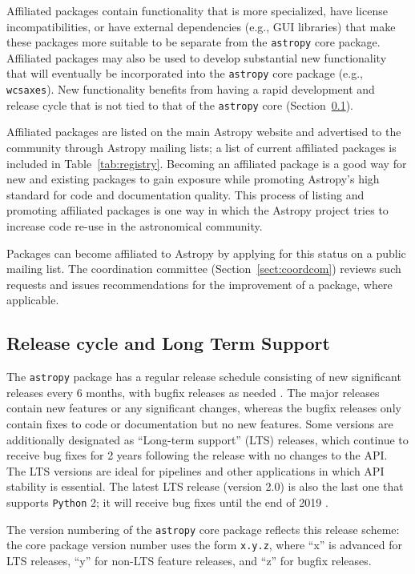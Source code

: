 \documentclass[modern]{aastex62}
\newcommand{\package}[1]{\texttt{#1}\xspace}
\newcommand{\python}{\package{Python}}
\newcommand{\astropy}{Astropy\xspace}
\newcommand{\astropypkg}{\package{astropy}}
\newcommand{\sectionname}{Section\xspace}
\renewcommand{\tablename}{Table\xspace}
\begin{document}
Affiliated packages contain functionality that is more specialized,
have license incompatibilities, or have external dependencies (e.g., GUI
libraries) that make these packages more suitable to be separate from the
\astropypkg core package.
Affiliated packages may also be used to develop substantial new functionality
that will eventually be incorporated into the \astropypkg core package
(e.g., \texttt{wcsaxes}).
New functionality benefits from having a rapid development and release cycle that is not tied to that of the \astropypkg core (\sectionname~\ref{sect:releasecycle}).

Affiliated packages are listed on the main \astropy website and advertised to
the community through \astropy mailing lists; a list of current affiliated
packages is included in \tablename~\ref{tab:registry}.
Becoming an affiliated package is a good way for new and existing packages to
gain exposure while promoting \astropy's high standard for code and
documentation quality.
This process of listing and promoting affiliated packages is one way in which
the \astropy project tries to increase code re-use in the astronomical
community.

Packages can become affiliated to \astropy by applying for this status on a public mailing list. The coordination committee (\sectionname~\ref{sect:coordcom}) reviews such requests and issues recommendations for the improvement of a package, where applicable.


\subsection{Release cycle and Long Term Support}
\label{sect:releasecycle}

The \astropypkg package has a regular release schedule consisting of new significant
releases every 6 months, with bugfix releases as needed \citep{ape2}.
The major releases contain new features or any significant changes, whereas
the bugfix releases only contain fixes to code or documentation but no new
features.
Some versions are additionally designated as ``Long-term support'' (LTS)
releases, which continue to receive bug fixes for 2 years following the release
with no changes to the API\@.
The LTS versions are ideal for pipelines and other applications in which API
stability is essential.
The latest LTS release (version 2.0) is also the last one that supports \python
2; it will receive bug fixes until the end of 2019 \citep{ape10}.

The version numbering of the \astropypkg core package reflects this release
scheme: the core package version number uses the form \texttt{x.y.z}, where ``x'' is
advanced for LTS releases, ``y'' for non-LTS feature releases, and
``z'' for bugfix releases.
\end{document}
